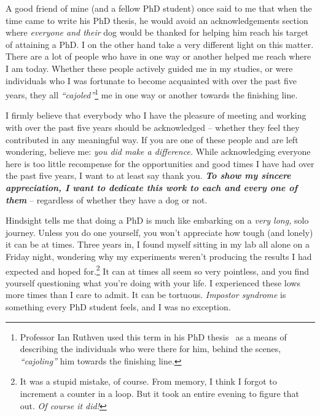 

\begin{preamble}
\setcounter{footnote}{0}
{}

A good friend of mine (and a fellow PhD student) once said to me that when the time came to write his PhD thesis, he would avoid an acknowledgements section where \emph{everyone and their} dog would be thanked for helping him reach his target of attaining a PhD. I on the other hand take a very different light on this matter. There are a lot of people who have in one way or another helped me reach where I am today. Whether these people actively guided me in my studies, or were individuals who I was fortunate to become acquainted with over the past five years, they all \emph{``cajoled''}\footnote{Professor Ian Ruthven used this term in his PhD thesis~\citep{ruthven2001phd} as a means of describing the individuals who were there for him, behind the scenes, \emph{``cajoling''} him towards the finishing line.} me in one way or another towards the finishing line.

I firmly believe that everybody who I have the pleasure of meeting and working with over the past five years should be acknowledged -- whether they feel they contributed in any meaningful way. If you are one of these people and are left wondering, believe me: \emph{you did make a difference.} While acknowledging everyone here is too little recompense for the opportunities and good times I have had over the past five years, I want to at least say thank you. \textbf{\emph{To show my sincere appreciation, I want to dedicate this work to each and every one of them}} -- regardless of whether they have a dog or not.

Hindsight tells me that doing a PhD is much like embarking on a \emph{very long,} solo journey. Unless you do one yourself, you won't appreciate how tough (and lonely) it can be at times. Three years in, I found myself sitting in my lab all alone on a Friday night, wondering why my experiments weren't producing the results I had expected and hoped for.\footnote{It was a stupid mistake, of course. From memory, I think I forgot to increment a counter in a loop. But it took an entire evening to figure that out. \emph{Of course it did!}} It can at times all seem so very pointless, and you find yourself questioning what you're doing with your life. I experienced these lows more times than I care to admit. It can be tortuous. \emph{Impostor syndrome} is something every PhD student feels, and I was no exception.


\end{preamble}
